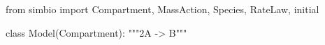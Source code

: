 \documentclass[namedate,numsec,webpdf,modern,large]{oup-authoring-template}
\theoremstyle{thmstyleone}%
\theoremstyle{thmstyletwo}%
\theoremstyle{thmstylethree}%
\newenvironment{CodeInput}{\begin{tcolorbox}[title=input,boxrule=0pt]}{\end{tcolorbox}}
\newcommand{\KeywordTok}[1]{\textcolor[rgb]{0.00,0.13,1.00}{#1}}
\newcommand{\ClassTok}[1]{\textcolor[rgb]{0.27,0.56,0.65}{#1}}
\newcommand{\FunctionTok}[1]{\textcolor[rgb]{0.47,0.37,0.15}{#1}}
\newcommand{\CommentTok}[1]{\textcolor[rgb]{0.00,0.50,0.00}{#1}}
\begin{document}
\begin{figure*}[t]

  \begin{minipage}[t]{\linewidth}
    \centering 
    \begin{CodeInput}
    \begin{Highlighting}[]
    \KeywordTok{from}\ClassTok{ simbio }\KeywordTok{import}\ClassTok{ Compartment, MassAction, Species, RateLaw, \FunctionTok{initial}}
    \end{Highlighting}
    \end{CodeInput}
  \end{minipage}%
  \newline
  \begin{minipage}[t]{\linewidth}
    \centering 
    \begin{minipage}[c]{0.60\linewidth}
      \centering 
      \begin{CodeInput}
      \begin{Highlighting}[]
        \KeywordTok{class}\ClassTok{ Model}\KeywordTok{(}\ClassTok{Compartment}\KeywordTok{)}:
            \CommentTok{"""2A {-}\textgreater{} B"""}
        

\end{Highlighting}
\end{CodeInput}
\end{minipage}
\end{minipage}
\end{figure*}
\end{document}
